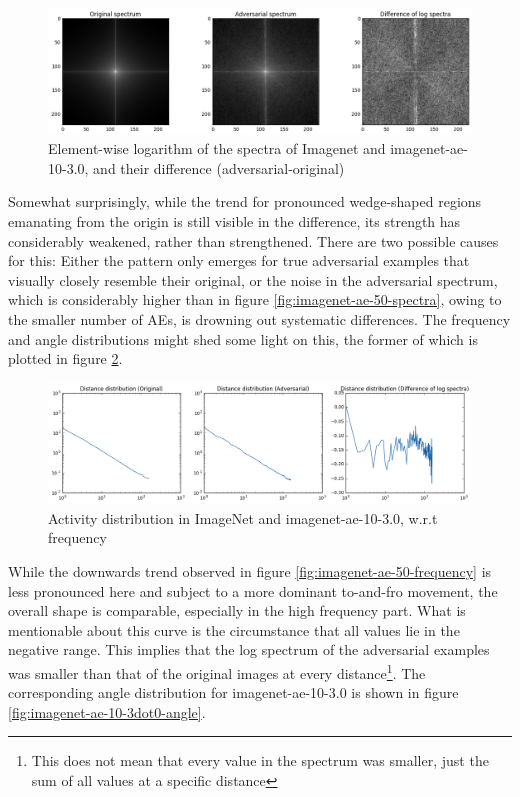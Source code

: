 \documentclass[11pt, a4paper]{article}
\begin{document}
\begin{figure}[htb]
	\centering
	\includegraphics[width=\textwidth]{images/spectra/imagenet-ae-10-3dot0-minconfidence-0dot9-maxorig-20000-spectra.png}
	\caption{Element-wise logarithm of the spectra of Imagenet and imagenet-ae-10-3.0, and their difference (adversarial-original)}
	\label{fig:imagenet-ae-10-3dot0-spectra}
\end{figure}

Somewhat surprisingly, while the trend for pronounced wedge-shaped regions emanating from the origin is still visible in the difference, its strength has considerably weakened, rather than strengthened. There are two possible causes for this: Either the pattern only emerges for true adversarial examples that visually closely resemble their original, or the noise in the adversarial spectrum, which is considerably higher than in figure \ref{fig:imagenet-ae-50-spectra}, owing to the smaller number of AEs, is drowning out systematic differences. The frequency and angle distributions might shed some light on this, the former of which is plotted in figure \ref{fig:imagenet-ae-10-3dot0-frequency}.

\begin{figure}[htb]
	\centering
	\includegraphics[width=\textwidth]{images/spectra/imagenet-ae-10-3dot0-minconfidence-0dot9-maxorig-20000-distance-158-bins.png}
	\caption{Activity distribution in ImageNet and imagenet-ae-10-3.0, w.r.t frequency}
	\label{fig:imagenet-ae-10-3dot0-frequency}
\end{figure}

While the downwards trend observed in figure \ref{fig:imagenet-ae-50-frequency} is less pronounced here and subject to a more dominant to-and-fro movement, the overall shape is comparable, especially in the high frequency part. What is mentionable about this curve is the circumstance that all values lie in the negative range. This implies that the log spectrum of the adversarial examples was smaller than that of the original images at every distance\footnote{This does not mean that every value in the spectrum was smaller, just the sum of all values at a specific distance}. The corresponding angle distribution for imagenet-ae-10-3.0 is shown in figure \ref{fig:imagenet-ae-10-3dot0-angle}.
\end{document}
